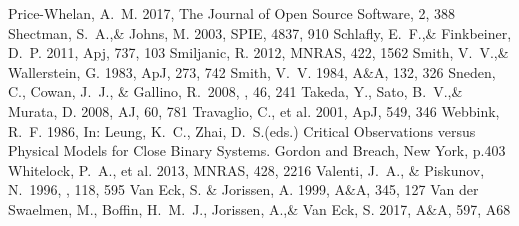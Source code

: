 \documentclass[a4paper,fleqn,usenatbib]{mnras}
\begin{document}
\begin{thebibliography}{99}
Price-Whelan, A.~M. 2017, 
The Journal of Open Source Software, 2, 388
Shectman, S.~A.,\& Johns, M. 2003, 
SPIE, 4837, 910
Schlafly, E.~F.,\& Finkbeiner, D.~P. 2011, 
Apj, 737, 103
Smiljanic, R. 2012, 
MNRAS, 422, 1562
Smith, V.~V.,\& Wallerstein, G. 1983, 
ApJ, 273, 742
Smith, V.~V. 1984, 
A$\&$A, 132, 326
 Sneden, C., Cowan, J.~J., \& Gallino, R.\ 2008, \araa, 46, 241 
Takeda, Y., Sato, B.~V.,\& Murata, D. 2008, 
AJ, 60, 781
Travaglio, C., et al. 2001, 
ApJ, 549, 346
Webbink, R.~F. 1986, 
In: Leung, K.~C., Zhai, D.~S.(eds.) Critical Observations versus Physical Models for Close Binary Systems. Gordon and Breach, New York, p.403
Whitelock, P.~A., et al. 2013, 
MNRAS, 428, 2216
 Valenti, J.~A., \& Piskunov, N.\ 1996, \aaps, 118, 595 
Van Eck, S. \& Jorissen, A. 1999, 
A$\&$A, 345, 127
Van der Swaelmen, M., Boffin, H.~M.~J., Jorissen, A.,\& Van Eck, S. 2017, 
A$\&$A, 597, A68
\end{thebibliography}
\bsp	%
\label{lastpage}
\end{document}
